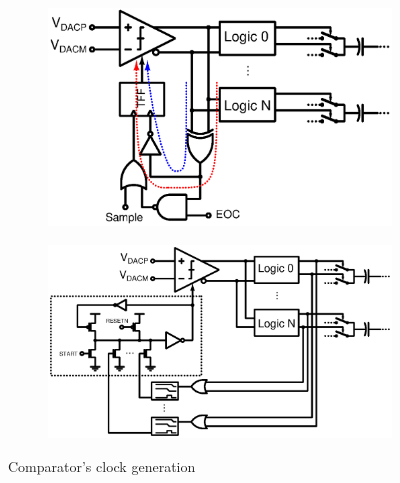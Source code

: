 \begin{figure}[htp]
	\centering
    \begin{subfigure}[b]{0.48\textwidth}
        \includegraphics[width=\textwidth]{Chapter3/Figs/sar_logic_JChen2011.ps}
        \label{fig:sar_logic_jchen2011}
	\end{subfigure}
	\begin{subfigure}[b]{0.44\textwidth}
        \includegraphics[width=\textwidth]{Chapter3/Figs/sar_logic_wong2013.ps}
        \label{fig:sar_logic_wong2013}
    \end{subfigure}
	\caption{Comparator's clock generation}
	\label{fig:sar_cmp_clock}
\end{figure}

